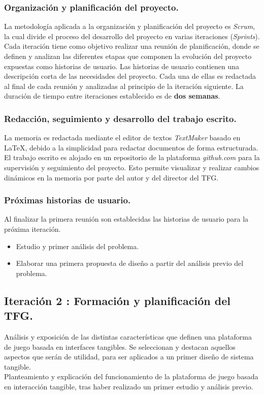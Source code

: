 \subsubsection{Organización y planificación del proyecto.}
La metodología aplicada a la organización y planificación del proyecto es \emph{Scrum}, la cual divide el proceso del desarrollo del proyecto en varias iteraciones (\emph{Sprints}).
Cada iteración tiene como objetivo realizar una reunión de planificación, donde se definen y analizan las diferentes etapas que componen la evolución del proyecto expuestas como historias de usuario.
Las historias de usuario contienen una descripción corta de las necesidades del proyecto. Cada una de ellas es redactada al final de cada reunión y analizadas al principio de la iteración siguiente.
La duración de tiempo entre iteraciones establecido es de \textbf{dos semanas}. 

\subsubsection{Redacción, seguimiento y desarrollo del trabajo escrito.}
La memoria es redactada mediante el editor de textos \emph{TextMaker} basado en \LaTeX{}, debido a la simplicidad para redactar documentos de forma estructurada.
El trabajo escrito es alojado en un repositorio de la plataforma \emph{github.com} para la supervisión y seguimiento del proyecto. Esto permite visualizar y realizar cambios dinámicos en la memoria por parte del autor y del director del TFG.

\subsubsection{Próximas historias de usuario.}
Al finalizar la primera reunión son establecidas las historias de usuario para la próxima iteración.
\begin{itemize}
\item Estudio y primer análisis del problema.
\item Elaborar una primera propuesta de diseño a partir del análisis previo del problema.
\end{itemize}

\subsection{Iteración 2 : Formación y planificación del TFG. }
Análisis y exposición de las distintas características que definen una plataforma de juego basada en interfaces tangibles. Se seleccionan y destacan aquellos aspectos que serán de utilidad, para ser aplicados a un primer diseño de sistema tangible.\\
Planteamiento y explicación del funcionamiento de la plataforma de juego basada en interacción tangible, tras haber realizado un primer estudio y análisis previo.

